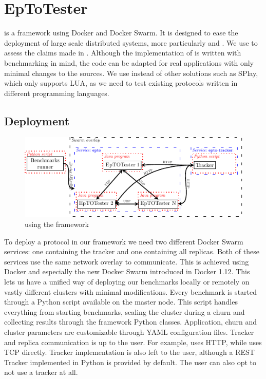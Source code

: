 \section{EpToTester}
\label{sec:epto}
\eptotester is a framework using Docker and Docker Swarm. It is designed to ease the deployment of large scale distributed systems, more particularly \jgroups and \epto. We use \eptotester to assess the claims made in \autocite{matos2015epto}. Although the implementation of \epto is written with benchmarking in mind, the code can be adapted for real applications with only minimal changes to the sources. We  use \eptotester instead of other solutions such as SPlay, which only supports LUA, as we need to test existing protocols written in different programming languages.
\subsection{Deployment}
\begin{figure}[htp]
	\centering
	\includegraphics[width=\linewidth]{figures/complete-architecture.pdf}
	\vspace{-2mm} 
	\caption[Caption]{\epto using the \eptotester framework\footnotemark}
	\vspace{-2mm} 
	\label{fig:complete-architecture}
\end{figure}
To deploy a protocol in our framework we need two different Docker Swarm services: one containing the tracker and one containing all replicas. Both of these services use the same network overlay to communicate. This is achieved using Docker and especially the new Docker Swarm introduced in Docker 1.12. This lets us have a unified way of deploying our benchmarks locally or remotely on vastly different clusters with minimal modifications. Every benchmark is started through a Python script available on the master node. This script handles everything from starting benchmarks, scaling the cluster during a churn and collecting results through the framework Python classes. Application, churn and cluster  parameters are customizable through YAML configuration files. Tracker and replica communication is up to the user. For example, \epto uses HTTP, while \jgroups uses TCP directly. Tracker implementation is also left to the user, although a REST Tracker implemented in Python is provided by default. The user can also opt to not use a tracker at all.
